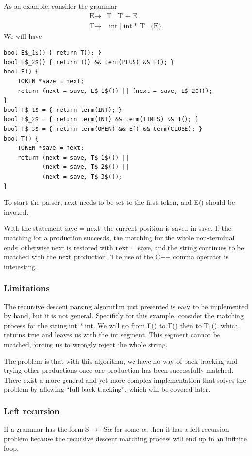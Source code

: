 As an example, consider the grammar 
\begin{equation}\label{favgrammar}\begin{split}
\text{E}\rightarrow&\text{T }|\text{ T + E }\\\text{T}\rightarrow&\text{ int }|\text{ int * T }|\text{ (E).}
\end{split}\end{equation}
We will have
\begin{lstlisting}[mathescape]
bool E$_1$() { return T(); }
bool E$_2$() { return T() && term(PLUS) && E(); }
bool E() {
	TOKEN *save = next;
	return (next = save, E$_1$()) || (next = save, E$_2$());
}
bool T$_1$ = { return term(INT); }
bool T$_2$ = { return term(INT) && term(TIMES) && T(); }
bool T$_3$ = { return term(OPEN) && E() && term(CLOSE); }
bool T() {
	TOKEN *save = next;
	return (next = save, T$_1$()) || 
		   (next = save, T$_2$()) || 
		   (next = save, T$_3$());
}
\end{lstlisting}
To start the parser, {\sf next} needs to be set to the first token, and E() should be invoked. 

With the statement {\sf *save = next}, the current position is saved in {\sf save}. If the matching for a production succeeds, the matching for the whole non-terminal ends; otherwise {\sf next} is restored with {\sf next = save}, and the string continues to be matched with the next production. The use of the C++ comma operator is interesting.
\subsubsection{Limitations}
The recursive descent parsing algoruthm just presented is easy to be implemented by hand, but it is not general. Specificly for this example, consider the matching process for the string {\sf int * int}. We will go from E() to T() then to T$_1$(), which returns true and leaves us with the {\sf * int} segment. This segment cannot be matched, forcing us to wrongly reject the whole string. 

The problem is that with this algorithm, we have no way of back tracking and trying other productions once one production has been successfully matched. There exist a more general and yet more complex implementation that solves the problem by allowing ``full back tracking'', which will be covered later.
\subsubsection{Left recursion}
If a grammar has the form S$\rightarrow^+$S$\alpha$ for some $\alpha$, then it has a left recursion problem because the recursive descent matching process will end up in an infinite loop.

